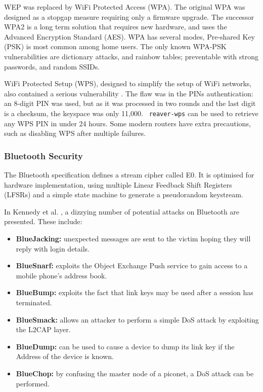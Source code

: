 \documentclass[10pt,journal,compsoc]{IEEEtran}
\begin{document}
WEP was replaced by WiFi Protected Access (WPA). The original WPA was designed
as a stopgap measure requiring only a firmware upgrade. The successor WPA2 is a
long term solution that requires new hardware, and uses the Advanced Encryption
Standard (AES). WPA has several modes, Pre-shared Key (PSK) is most common
among home users. The only known WPA-PSK vulnerabilities are dictionary
attacks, and rainbow tables; preventable with strong passwords, and random
SSIDs. 

WiFi Protected Setup (WPS), designed to simplify the setup of WiFi networks,
also contained a serious vulnerability \cite{Viehbock2011}. The flaw was in the
PINs authentication: an 8-digit PIN was used, but as it was processed in two
rounds and the last digit is a checksum, the keyspace was only 11,000. {\tt
reaver-wps} can be used to retrieve any WPS PIN in under 24 hours. Some modern
routers have extra precautions, such as disabling WPS after multiple failures. 

\subsubsection{Bluetooth Security}
The Bluetooth specification \cite{BTSpec} defines a stream cipher called E0.
It is optimised for  hardware implementation, using multiple Linear Feedback
Shift Registers (LFSRs) and a simple state machine to generate a pseudorandom
keystream. 

In Kennedy et al. \cite{Kennedy2008}, a dizzying number of potential attacks on
Bluetooth are presented. These include: 
\begin{itemize}[$\bullet$]
\item {\bf BlueJacking:} unexpected messages are sent to the victim hoping they
will reply with login details. 
\item {\bf BlueSnarf:} exploits the Object Exchange Push service to gain
access to a mobile phone's address book. 
\item {\bf BlueBump:} exploits the fact that link keys may be used after a session
has terminated. 
\item {\bf BlueSmack:} allows an attacker to perform a simple DoS attack by
exploiting the L2CAP layer.
\item {\bf BlueDump:} can be used to cause a device to dump its link key if the
 Address of the device is known. 
\item {\bf BlueChop:} by confusing the master node of a piconet, a DoS attack can be
performed. 
\end{itemize}
\end{document}
